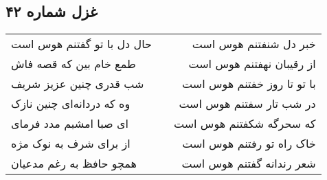 \begin{center}
\section*{غزل شماره ۴۲}
\label{sec:sh042}
\begin{longtable}{l p{0.5cm} r}
حال دل با تو گفتنم هوس است
&&
خبر دل شنفتنم هوس است
\\
طمع خام بین که قصه فاش
&&
از رقیبان نهفتنم هوس است
\\
شب قدری چنین عزیز شریف
&&
با تو تا روز خفتنم هوس است
\\
وه که دردانه‌ای چنین نازک
&&
در شب تار سفتنم هوس است
\\
ای صبا امشبم مدد فرمای
&&
که سحرگه شکفتنم هوس است
\\
از برای شرف به نوک مژه
&&
خاک راه تو رفتنم هوس است
\\
همچو حافظ به رغم مدعیان
&&
شعر رندانه گفتنم هوس است
\\
\end{longtable}
\end{center}
